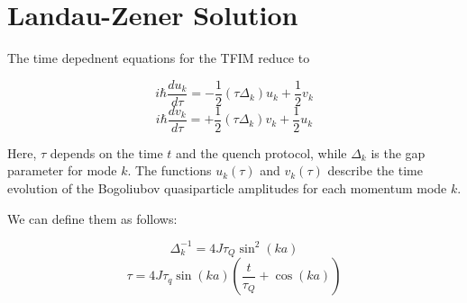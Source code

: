 \documentclass{article}
\begin{document}
\section{Landau-Zener Solution}
The time depednent equations for the TFIM reduce to 

\begin{equation}
    i \hbar \frac{d u_k}{d\tau } = 
    -\frac{1}{2} ( \tau \Delta_k) u_k + \frac{1}{2}v_k
\end{equation}
\begin{equation}
    i \hbar \frac{d v_k}{d\tau } = 
    +\frac{1}{2} ( \tau \Delta_k) v_k + \frac{1}{2}u_k
\end{equation}

Here, $\tau$ depends on the time $t$ and the quench protocol, while $\Delta_k$ is the gap parameter for mode $k$. The functions $u_k(\tau)$ and $v_k(\tau)$ describe the time evolution of the Bogoliubov quasiparticle amplitudes for each momentum mode $k$.

We can define them as follows:

\begin{equation}
    \Delta_k ^{-1} = 4 J \tau_Q \sin^2(ka)
\end{equation}
\begin{equation}
    \tau = 4 J \tau_q \sin(ka)(\frac{t}{\tau_Q}+\cos(ka))
\end{equation}
\end{document}
